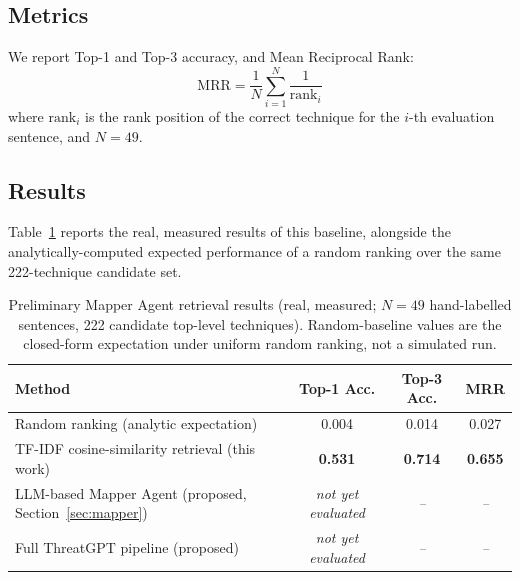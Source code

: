 \documentclass[runningheads]{llncs}
\begin{document}
\subsection{Metrics}

We report Top-1 and Top-3 accuracy, and Mean Reciprocal Rank:
\begin{equation}
\text{MRR} = \frac{1}{N}\sum_{i=1}^{N}\frac{1}{\text{rank}_i}
\label{eq:mrr}
\end{equation}
where $\text{rank}_i$ is the rank position of the correct technique for the $i$-th evaluation sentence, and $N=49$.

\subsection{Results}

Table~\ref{tab:results} reports the real, measured results of this baseline, alongside the analytically-computed expected performance of a random ranking over the same 222-technique candidate set.

\begin{table}[t]
\centering
\caption{Preliminary Mapper Agent retrieval results (real, measured; $N=49$ hand-labelled sentences, 222 candidate top-level techniques). Random-baseline values are the closed-form expectation under uniform random ranking, not a simulated run.}
\label{tab:results}
\begin{tabular}{@{}lccc@{}}
\toprule
\textbf{Method} & \textbf{Top-1 Acc.} & \textbf{Top-3 Acc.} & \textbf{MRR} \\
\midrule
Random ranking (analytic expectation) & 0.004 & 0.014 & 0.027 \\
TF-IDF cosine-similarity retrieval (this work) & \textbf{0.531} & \textbf{0.714} & \textbf{0.655} \\
LLM-based Mapper Agent (proposed, Section~\ref{sec:mapper}) & \emph{not yet evaluated} & \emph{--} & \emph{--} \\
Full ThreatGPT pipeline (proposed) & \emph{not yet evaluated} & \emph{--} & \emph{--} \\
\bottomrule
\end{tabular}
\end{table}
\end{document}
